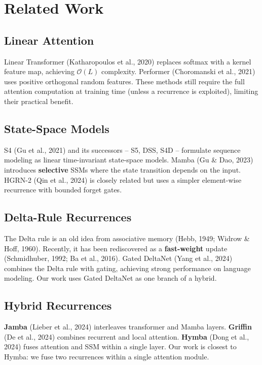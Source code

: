 \section{Related Work}

\subsection{Linear Attention}

Linear Transformer (Katharopoulos et al., 2020) replaces softmax with a 
kernel feature map, achieving $\mathcal{O}(L)$ complexity. Performer 
(Choromanski et al., 2021) uses positive orthogonal random features. These 
methods still require the full attention computation at training time 
(unless a recurrence is exploited), limiting their practical benefit.

\subsection{State-Space Models}

S4 (Gu et al., 2021) and its successors -- S5, DSS, S4D -- formulate sequence 
modeling as linear time-invariant state-space models. Mamba (Gu \& Dao, 2023) 
introduces \textbf{selective} SSMs where the state transition depends on the 
input. HGRN-2 (Qin et al., 2024) is closely related but uses a simpler 
element-wise recurrence with bounded forget gates.

\subsection{Delta-Rule Recurrences}

The Delta rule is an old idea from associative memory (Hebb, 1949; Widrow \& 
Hoff, 1960). Recently, it has been rediscovered as a \textbf{fast-weight} update 
(Schmidhuber, 1992; Ba et al., 2016). Gated DeltaNet (Yang et al., 2024) 
combines the Delta rule with gating, achieving strong performance on 
language modeling. Our work uses Gated DeltaNet as one branch of a hybrid.

\subsection{Hybrid Recurrences}

\textbf{Jamba} (Lieber et al., 2024) interleaves transformer and Mamba layers. 
\textbf{Griffin} (De et al., 2024) combines recurrent and local attention. 
\textbf{Hymba} (Dong et al., 2024) fuses attention and SSM within a single layer. 
Our work is closest to Hymba: we fuse two recurrences within a single 
attention module.

